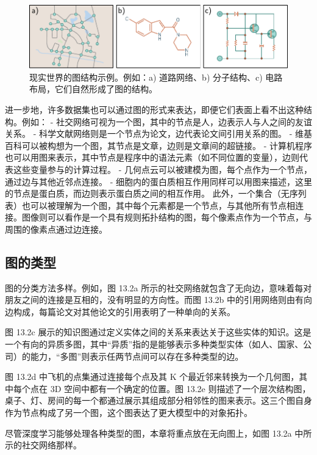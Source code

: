 \documentclass[lang=cn,newtx,10pt,scheme=chinese]{elegantbook}
\begin{document}
\begin{figure}[ht!]
\centering
\includegraphics[width=0.7\linewidth]{PDFFigures/UDLChap13PDF/GraphRealWorld.pdf}
\caption{现实世界的图结构示例。例如：a) 道路网络、b) 分子结构、c) 电路布局，它们自然形成了图的结构。}
\end{figure}


进一步地，许多数据集也可以通过图的形式来表达，即便它们表面上看不出这种结构。例如：
- 社交网络可视为一个图，其中的节点是人，边表示人与人之间的友谊关系。
- 科学文献网络则是一个节点为论文，边代表论文间引用关系的图。
- 维基百科可以被构想为一个图，其节点是文章，边则是文章间的超链接。
- 计算机程序也可以用图来表示，其中节点是程序中的语法元素（如不同位置的变量），边则代表这些变量参与的计算过程。
- 几何点云可以被建模为图，每个点作为一个节点，通过边与其他近邻点连接。
- 细胞内的蛋白质相互作用同样可以用图来描述，这里的节点是蛋白质，而边则表示蛋白质之间的相互作用。
此外，一个集合（无序列表）也可以被理解为一个图，其中每个元素都是一个节点，与其他所有节点相连接。图像则可以看作是一个具有规则拓扑结构的图，每个像素点作为一个节点，与周围的像素点通过边连接。

\subsection{图的类型}
图的分类方法多样。例如，图 13.2a 所示的社交网络就包含了无向边，意味着每对朋友之间的连接是互相的，没有明显的方向性。而图 13.2b 中的引用网络则由有向边构成，每篇论文对其他论文的引用表明了一种单向的关系。

图 13.2c 展示的知识图通过定义实体之间的关系来表达关于这些实体的知识。这是一个有向的异质多图，其中“异质”指的是能够表示多种类型实体（如人、国家、公司）的能力，“多图”则表示任两节点间可以存在多种类型的边。

图 13.2d 中飞机的点集通过连接每个点及其 K 个最近邻来转换为一个几何图，其中每个点在 3D 空间中都有一个确定的位置。图 13.2e 则描述了一个层次结构图，桌子、灯、房间的每一个都通过展示其组成部分相邻性的图来表示。这三个图自身作为节点构成了另一个图，这个图表达了更大模型中的对象拓扑。

尽管深度学习能够处理各种类型的图，本章将重点放在无向图上，如图 13.2a 中所示的社交网络那样。
\end{document}
